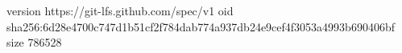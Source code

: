 version https://git-lfs.github.com/spec/v1
oid sha256:6d28e4700c747d1b51cf2f784dab774a937db24e9cef4f3053a4993b690406bf
size 786528
